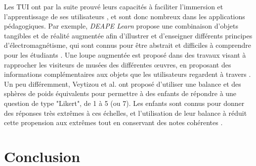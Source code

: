 			Les TUI ont par la suite prouvé leurs capacités à faciliter l'immersion et l'apprentissage de ses utilisateurs \cite{zuckerman_tui_2013, fleck_marker-based_2015, cheng_affordances_2013}, et sont donc nombreux dans les applications pédagogiques. Par exemple, \textit{DEAPE Learn} propose une combinaison d'objets tangibles et de réalité augmentée afin d'illustrer et d'enseigner différents principes d'électromagnétisme, qui sont connus pour être abstrait et difficiles à comprendre pour les étudiants \cite{da_costa_realite_2019}. Une loupe augmentée est proposé dans des travaux visant à rapprocher les visiteurs de musées des différentes œuvres, en proposant des informations complémentaires aux objets que les utilisateurs regardent à travers \cite{damala_loupe_2016}. Un peu différemment, Veytizou et al. ont proposé d'utiliser une balance et des sphères de poids équivalents pour permettre à des enfants de répondre à une question de type "Likert", de 1 à 5 (ou 7). Les enfants sont connus pour donner des réponses très extrêmes à ces échelles, et l'utilisation de leur balance à réduit cette propension aux extrêmes tout en conservant des notes cohérentes \cite{veytizou_could_2018}.
	
	
	
				
	\section*{Conclusion}